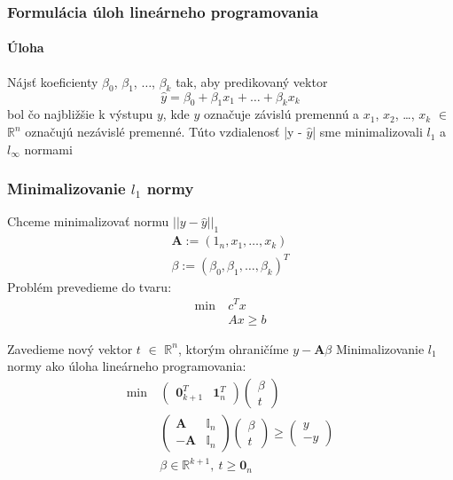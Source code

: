 \documentclass[presentation.tex]{subfiles}
\begin{document}
	
	\begin{frame}
		\frametitle{Formulácia úloh lineárneho programovania}
		\framesubtitle{Úloha}
		   Nájsť koeficienty $\beta_0$, $\beta_1$, $\ldots$, $\beta_k$ tak, aby predikovaný vektor 
		\begin{equation}
			\hat{y} = \beta_0 + \beta_1 x_1 + \ldots + \beta_k x_k
		\end{equation}
		bol čo najbližšie k výstupu $y$, kde $y$ označuje závislú premennú a $x_1$, $x_2$, \ldots, $x_k$ $\in$ $\mathbb{R}^n$ označujú nezávislé premenné.
		Túto vzdialenosť |y - $\hat{y}$| sme minimalizovali $l_1$ a $l_{\infty}$ normami
	\end{frame}
	
	\begin{frame}
		\frametitle{Minimalizovanie $l_1$ normy}
		Chceme minimalizovať normu $||y - \hat{y}||_1$ \\
		\begin{equation}
			\begin{split}
			\mathbf{A} := (1_n, x_1, \dots, x_k) \\
			\beta := (\beta_0, \beta_1, \dots, \beta_k)^T
			\end{split}
		\end{equation}
		\text Problém prevedieme do tvaru:
		\begin{align*}
			\text{min}~ &c^Tx\\
			&Ax \geq b
		\end{align*}
	\end{frame}
	
	\begin{frame}
		\text Zavedieme nový vektor $t$ $\in$ $\mathbb{R}^n$, ktorým ohraničíme $y - \mathbf{A} \beta$
		Minimalizovanie $l_{1}$ normy ako úloha lineárneho programovania:
		\begin{align*}
			\text{min}~ &
			\left(
			\begin{array}{c|c}
				\mathbf{0}_{k+1}^T & \mathbf{1}_n^T
			\end{array}
			\right)
			\left(
			\begin{array}{c}
				\beta \\
				\hline
				t
			\end{array}
			\right) \\
			&\left(
			\begin{array}{c|c}
				\mathbf{A} & \mathbb{I}_n \\
				\hline
				-\mathbf{A} & \mathbb{I}_n
			\end{array}
			\right)
			\left(
			\begin{array}{c}
				\beta \\
				\hline
				t
			\end{array}
			\right)
			\geq
			\left(
			\begin{array}{c}
				y \\
				\hline
				-y
			\end{array}
			\right) \\
			&\beta \in \mathbb{R}^{k+1},~t \geq \mathbf{0}_{n}
		\end{align*}
	\end{frame}
	
\end{document}
